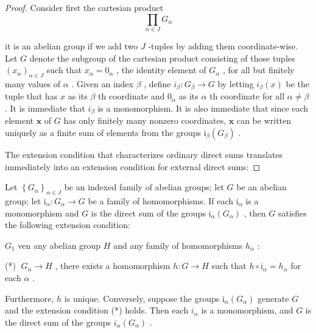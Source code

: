 \begin{proof}Consider first the cartesian product
\[
\mathop{\prod }\limits_{{\alpha  \in  J}}{G}_{\alpha }
\]

it is an abelian group if we add two \(J\) -tuples by adding them coordinate-wise. Let \(G\) denote the subgroup of the cartesian product consisting of those tuples \({\left( {x}_{\alpha }\right) }_{\alpha  \in  J}\) such that \({x}_{\alpha } = {0}_{\alpha }\) , the identity element of \({G}_{\alpha }\) , for all but finitely many values of \(\alpha\) . Given an index \(\beta\) , define \({i}_{\beta } : {G}_{\beta } \rightarrow  G\) by letting \({i}_{\beta }\left( x\right)\) be the tuple that has \(x\) as its \(\beta\) th coordinate and \({0}_{\alpha }\) as its \(\alpha\) th coordinate for all \(\alpha  \neq  \beta\) . It is immediate that \({i}_{\beta }\) is a monomorphism. It is also immediate that since each element \(\mathbf{x}\) of \(G\) has only finitely many nonzero coordinates, \(\mathbf{x}\) can be written uniquely as a finite sum of elements from the groups \({\mathrm{i}}_{\beta }\left( {G}_{\beta }\right)\) .

The extension condition that characterizes ordinary direct sums translates immediately into an extension condition for external direct sums:
\end{proof}
\begin{lemma} Let \({\left\{  {G}_{\alpha }\right\}  }_{\alpha  \in  J}\) be an indexed family of abelian groups; let \(G\) be an abelian group; let \({\mathrm{i}}_{\alpha } : {G}_{\alpha } \rightarrow  G\) be a family of homomorphisms. If each \({\mathrm{i}}_{\alpha }\) is a monomorphism and \(G\) is the direct sum of the groups \({\mathrm{i}}_{\alpha }\left( {G}_{\alpha }\right)\) , then \(G\) satisfies the following extension condition:

\({G}_{1}\) ven any abelian group \(H\) and any family of homomorphisms \({h}_{\alpha }\) :

(*) \(\;{G}_{\alpha } \rightarrow  H\) , there exists a homomorphism \(h : G \rightarrow  H\) such that \(h \circ  {\mathrm{i}}_{\alpha } = {h}_{\alpha }\) for each \(\alpha\) .

Furthermore, \(h\) is unique. Conversely, suppose the groups \({\mathrm{i}}_{\alpha }\left( {G}_{\alpha }\right)\) generate \(G\) and the extension condition (*) holds. Then each \({i}_{\alpha }\) is a monomorphism, and \(G\) is the direct sum of the groups \({i}_{\alpha }\left( {G}_{\alpha }\right)\) .
\end{lemma}


